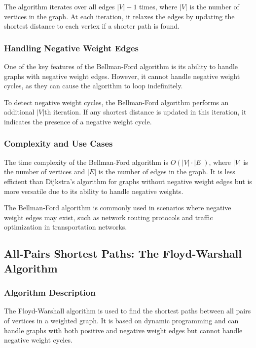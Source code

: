 \documentclass[12pt]{book} %
\begin{document}
The algorithm iterates over all edges \(|V|-1\) times, where \(|V|\) is the number of vertices in the graph. At each iteration, it relaxes the edges by updating the shortest distance to each vertex if a shorter path is found.

\subsubsection{Handling Negative Weight Edges}

One of the key features of the Bellman-Ford algorithm is its ability to handle graphs with negative weight edges. However, it cannot handle negative weight cycles, as they can cause the algorithm to loop indefinitely.

To detect negative weight cycles, the Bellman-Ford algorithm performs an additional \(|V|\)th iteration. If any shortest distance is updated in this iteration, it indicates the presence of a negative weight cycle.

\subsubsection{Complexity and Use Cases}

The time complexity of the Bellman-Ford algorithm is \(O(|V| \cdot |E|)\), where \(|V|\) is the number of vertices and \(|E|\) is the number of edges in the graph. It is less efficient than Dijkstra's algorithm for graphs without negative weight edges but is more versatile due to its ability to handle negative weights.

The Bellman-Ford algorithm is commonly used in scenarios where negative weight edges may exist, such as network routing protocols and traffic optimization in transportation networks.

\subsection{All-Pairs Shortest Paths: The Floyd-Warshall Algorithm}

\subsubsection{Algorithm Description}

The Floyd-Warshall algorithm is used to find the shortest paths between all pairs of vertices in a weighted graph. It is based on dynamic programming and can handle graphs with both positive and negative weight edges but cannot handle negative weight cycles.
\end{document}
